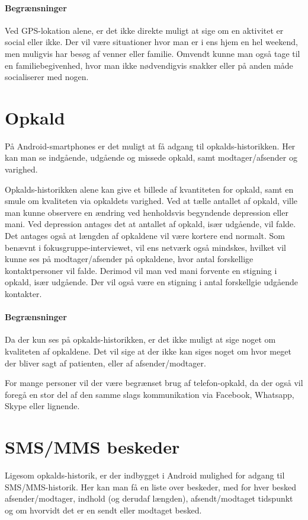\paragraph{Begrænsninger}
Ved GPS-lokation alene, er det ikke direkte muligt at sige om en aktivitet er social eller ikke.
Der vil være situationer hvor man er i ens hjem en hel weekend, men muligvis har besøg af venner eller familie.
Omvendt kunne man også tage til en familiebegivenhed, hvor man ikke nødvendigvis snakker eller på anden måde socialiserer med nogen.

\section{Opkald}
På Android-smartphones er det muligt at få adgang til opkalds-historikken.
Her kan man se indgående, udgående og missede opkald, samt modtager/afsender og varighed.

Opkalds-historikken alene kan give et billede af kvantiteten for opkald, samt en smule om kvaliteten via opkaldets varighed.
Ved at tælle antallet af opkald, ville man kunne observere en ændring ved henholdsvis begyndende depression eller mani.
Ved depression antages det at antallet af opkald, især udgående, vil falde.
Det antages også at længden af opkaldene vil være kortere end normalt.
Som benævnt i fokusgruppe-interviewet, vil ens netværk også mindskes, hvilket vil kunne ses på modtager/afsender på opkaldene, hvor antal forskellige kontaktpersoner vil falde.
Derimod vil man ved mani forvente en stigning i opkald, især udgående.
Der vil også være en stigning i antal forskellgie udgående kontakter.

\paragraph{Begrænsninger}
Da der kun ses på opkalds-historikken, er det ikke muligt at sige noget om kvaliteten af opkaldene.
Det vil sige at der ikke kan siges noget om hvor meget der bliver sagt af patienten, eller af afsender/modtager.

For mange personer vil der være begrænset brug af telefon-opkald, da der også vil foregå en stor del af den samme slags kommunikation via Facebook, Whatsapp, Skype eller lignende.

\section{SMS/MMS beskeder}
Ligesom opkalds-historik, er der indbygget i Android mulighed for adgang til SMS/MMS-historik.
Her kan man få en liste over beskeder, med for hver besked afsender/modtager, indhold (og derudaf længden), afsendt/modtaget tidspunkt og om hvorvidt det er en sendt eller modtaget besked.


